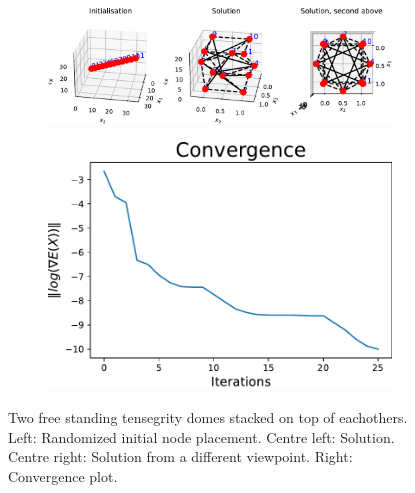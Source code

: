 \begin{figure}[!ht]
\centering
\begin{subfigure}{.72\textwidth}
  \centering
  \includegraphics[width=0.99\linewidth]{Bilder/2FREESTANDING.pdf}
\end{subfigure}%
\begin{subfigure}{.3\textwidth}
  \centering
  \includegraphics[width=0.99\linewidth]{Bilder/2FREESTANDINGconv.pdf}
\end{subfigure}
\caption{Two free standing tensegrity domes stacked on top of eachothers. Left: Randomized initial node placement. Centre left: Solution. Centre right: Solution from a different viewpoint. Right: Convergence plot.}
\label{2free}
\end{figure}